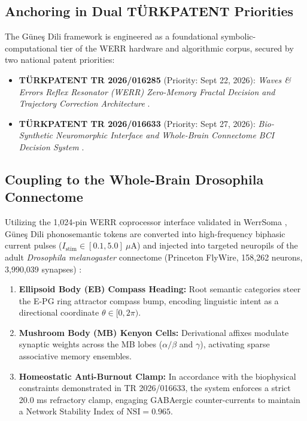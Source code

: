 \documentclass[11pt,a4paper]{article}
\begin{document}
\subsection{Anchoring in Dual TÜRKPATENT Priorities}

The Güneş Dili framework is engineered as a foundational symbolic-computational tier of the WERR hardware and algorithmic corpus, secured by two national patent priorities:
\begin{itemize}
    \item \textbf{TÜRKPATENT TR 2026/016285} (Priority: Sept 22, 2026): \textit{Waves \& Errors Reflex Resonator (WERR) Zero-Memory Fractal Decision and Trajectory Correction Architecture} \cite{turkpatent_oed_2026}.
    \item \textbf{TÜRKPATENT TR 2026/016633} (Priority: Sept 27, 2026): \textit{Bio-Synthetic Neuromorphic Interface and Whole-Brain Connectome BCI Decision System} \cite{turkpatent_werrsoma_2026}.
\end{itemize}

\subsection{Coupling to the Whole-Brain Drosophila Connectome}

Utilizing the 1,024-pin WERR coprocessor interface validated in WerrSoma \cite{dagli2026werrsoma}, Güneş Dili phonosemantic tokens are converted into high-frequency biphasic current pulses ($I_{\text{stim}} \in [0.1, 5.0]\ \mu\text{A}$) and injected into targeted neuropils of the adult \textit{Drosophila melanogaster} connectome (Princeton FlyWire, 158,262 neurons, 3,990,039 synapses) \cite{dorkenwald2024flywire, schlegel2024whole}:
\begin{enumerate}
    \item \textbf{Ellipsoid Body (EB) Compass Heading:} Root semantic categories steer the E-PG ring attractor compass bump, encoding linguistic intent as a directional coordinate $\theta \in [0, 2\pi)$.
    \item \textbf{Mushroom Body (MB) Kenyon Cells:} Derivational affixes modulate synaptic weights across the MB lobes ($\alpha/\beta$ and $\gamma$), activating sparse associative memory ensembles.
    \item \textbf{Homeostatic Anti-Burnout Clamp:} In accordance with the biophysical constraints demonstrated in TR 2026/016633, the system enforces a strict 20.0 ms refractory clamp, engaging GABAergic counter-currents to maintain a Network Stability Index of $\text{NSI} = 0.965$.
\end{enumerate}
\end{document}
